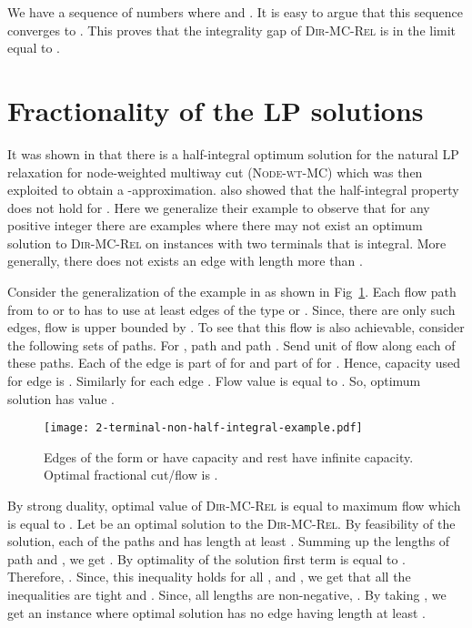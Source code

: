 \documentclass[11pt]{article}
\def\2DirMC{\text{-Bi-Cut}\xspace}
\def\NodeMC{\textsc{Node-wt-MC}\xspace}
\def\DirMCRel{\textsc{Dir-MC-Rel}\xspace}
\def\NodeMC{\textsc{Node-wt-MC}\xspace}
\begin{document}
\medskip
We have a sequence of numbers  where  and
. It is easy to argue
that this sequence converges to . This proves that the integrality
gap of \DirMCRel is in the limit equal to .

\section{Fractionality of the LP solutions}
\label{sec:fractionality}
It was shown in \cite{GargVY04} that there is a half-integral optimum
solution for the natural LP relaxation for node-weighted multiway cut
(\NodeMC) which was then exploited to obtain a
-approximation.  \cite{GargVY04} also showed that the
half-integral property does not hold for \2DirMC. Here we generalize
their example to observe that for any positive integer  there are
examples where there may not exist an optimum solution to \DirMCRel on
instances with two terminals that is  integral. More generally,
there does not exists an edge with length more than .

Consider the generalization of the example in \cite{GargVY04} as shown
in Fig~\ref{fig:2-terminal-non-half-integral-example}.  Each flow path
from  to  or  to  has to use at least  edges of the
type  or . Since, there are only
 such edges, flow is upper bounded by . To see that
this flow is also achievable, consider the following sets of
paths. For , path  and path . Send  unit of flow along
each of these paths. Each of the edge  is part of 
for  and part of  for . Hence, capacity
used for edge  is . Similarly for each
edge . Flow value is equal to . So, optimum
solution has value .


\begin{figure}[hbt]
\centering
\texttt{[image: 2-terminal-non-half-integral-example.pdf]}
\caption{Edges of the form  or  have capacity 
  and rest have infinite capacity. Optimal fractional cut/flow is .}
\label{fig:2-terminal-non-half-integral-example}
\end{figure}


By strong duality, optimal value of \DirMCRel is equal to maximum flow which is
equal to . Let  be an optimal solution to the
\DirMCRel. By feasibility of the solution, each of the paths  and
 has length at least . Summing up the lengths of path 
and , we get . By
optimality of the solution first term is equal to
. Therefore, . Since, this inequality holds for all , and
, we get that all
the inequalities are tight and . Since, all lengths are non-negative, . By taking , we get an instance where
optimal solution has no edge having length at least .
\end{document}
